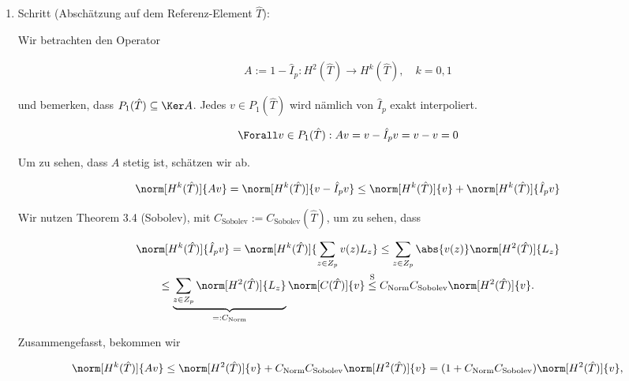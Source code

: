 \begin{solution}
\begin{enumerate}[label = \textbf{\alph*)}]
  \begin{enumerate}[label = \arabic*.]

    \item Schritt (Abschätzung auf dem Referenz-Element $\hat T$):

    Wir betrachten den Operator

    \begin{align*}
      A := 1 - \hat I_p:
      H^2(\hat T) \to H^k(\hat T),
      \quad
      k = 0, 1
    \end{align*}

    und bemerken, dass $P_1(\hat T) \subseteq \Ker A$.
    Jedes $v \in P_1(\hat T)$ wird nämlich von $\hat I_p$ exakt interpoliert.

    \begin{align*}
      \Forall v \in P_1(\hat T):
      A v = v - \hat I_p v = v - v = 0
    \end{align*}

    Um zu sehen, dass $A$ stetig ist, schätzen wir ab.

    \begin{align*}
      \norm[H^k(\hat T)]{A v}
      =
      \norm[H^k(\hat T)]{v - \hat I_p v}
      \leq
      \norm[H^k(\hat T)]{v}
      +
      \norm[H^k(\hat T)]{\hat I_p v}
    \end{align*}

    Wir nutzen Theorem 3.4 (Sobolev), mit $C_\mathrm{Sobolev} := C_\mathrm{Sobolev}(\hat T)$, um zu sehen, dass

    \begin{multline*}
      \norm[H^k(\hat T)]{\hat I_p v}
      =
      \norm[H^k(\hat T)]
      {
        \sum_{z \in Z_p}
        v(z) L_z
      }
      \leq
      \sum_{z \in Z_p}
      \abs{v(z)} \norm[H^2(\hat T)]{L_z} \\
      \leq
      \underbrace
      {
        \sum_{z \in Z_p}
        \norm[H^2(\hat T)]{L_z}
      }_{
        =: C_\mathrm{Norm}
      }
      \norm[C(\hat T)]{v}
      \stackrel
      {
        \mathrm{S}
      }{\leq}
      C_\mathrm{Norm}
      C_\mathrm{Sobolev}
      \norm[H^2(\hat T)]{v}.
    \end{multline*}

    Zusammengefasst, bekommen wir

    \begin{align*}
      \norm[H^k(\hat T)]{A v}
      \leq
      \norm[H^2(\hat T)]{v}
      +
      C_\mathrm{Norm}
      C_\mathrm{Sobolev}
      \norm[H^2(\hat T)]{v}
      =
      (1 + C_\mathrm{Norm} C_\mathrm{Sobolev})
      \norm[H^2(\hat T)]{v},
    \end{align*}


\end{enumerate}
\end{enumerate}
\end{solution}

